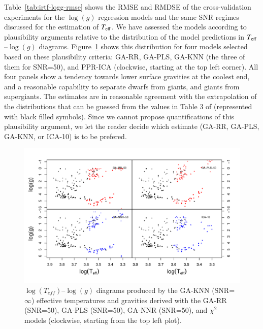 Table~\ref{tab:irtf-logg-rmse} shows the RMSE and RMDSE of the
cross-validation experiments for the $\log(g)$ regression models and
the same SNR regimes discussed for the estimation of $T_{\rm eff}$. We
have assessed the models according to plausibility arguments relative
to the distribution of the model predictions in $T_{\rm
eff}$--$\log(g)$ diagrams.  Figure~\ref{fig:lt_lg_ga} shows this
distribution for four models selected based on these plausibility
criteria: GA-RR, GA-PLS, GA-KNN (the three of them for SNR=50), and
PPR-ICA (clockwise, starting at the top left corner). All four panels
show a tendency towards lower surface gravities at the coolest end,
and a reasonable capability to separate dwarfs from giants, and giants
from supergiants. The estimates are in reasonable agreement with the
extrapolation of the distributions that can be guessed from the values
in Table 3 of \cite{cesetti} (represented with black filled
symbols). Since we cannot propose quantifications of this plausibility
argument, we let the reader decide which estimate (GA-RR, GA-PLS,
GA-KNN, or ICA-10) is to be prefered.

\begin{figure}
 \begin{center}
   \includegraphics[width=\textwidth]{figs/ordieres-fig4.pdf}

\caption{$\log(T_{eff})$--$\log(g)$ diagrams produced by the GA-KNN
   (SNR=$\infty$) effective temperatures and gravities derived with
   the GA-RR (SNR=50), GA-PLS (SNR=50), GA-NNR (SNR=50), and $\chi^2$
   models (clockwise, starting from the top left plot).}

\label{fig:lt_lg_ga}
 \end{center}
\end{figure}


